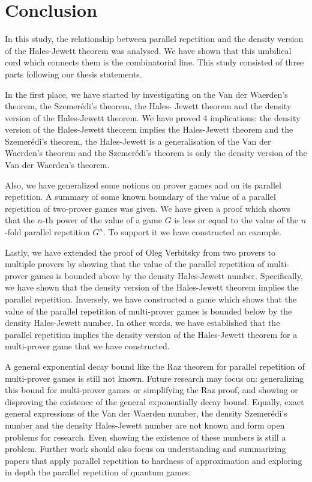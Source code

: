 \chapter{Conclusion}

In this study, the relationship between parallel repetition and the density version of the Hales-Jewett theorem was analysed. We have shown that this umbilical cord which connects them is the combinatorial line. This study consisted of three parts  following our thesis statements. 

In the first place, we have started by investigating on
the Van der Waerden's theorem,  the Szemerédi's theorem, the Hales-  Jewett theorem
and the density version of the Hales-Jewett theorem. We have proved 4 implications: the density version of the Hales-Jewett theorem implies the Hales-Jewett theorem and the Szemerédi's theorem, the Hales-Jewett is a generalisation of the Van der Waerden's theorem and the Szemerédi's theorem is only the density version of the Van der Waerden's theorem.

Also, we have generalized
some notions on prover games and on its parallel repetition. A summary of some known boundary of the value of a parallel repetition of two-prover games was given. We have given a proof which shows that the $n$-th power of the value of a game $G$  is less or equal to the value of the $n$-fold parallel repetition $G^n.$
To support it we have constructed  an example.

Lastly, we have extended the proof of Oleg Verbitsky from two provers to multiple provers by showing that the value of the parallel repetition of multi-prover games is bounded above by the density Hales-Jewett number. Specifically, we have shown that the density version of the Hales-Jewett theorem implies the parallel repetition. Inversely, we have constructed a game which shows that the value of the parallel repetition of multi-prover games is bounded below by the density Hales-Jewett number. In other words, we have established that the parallel repetition implies the density version of the Hales-Jewett theorem for a multi-prover game that we have constructed.

A general exponential decay bound like the Raz theorem for parallel repetition of  multi-prover games is still not known. Future research may focus on: generalizing this bound for multi-prover games or simplifying the Raz proof, and showing or disproving the existence of the general exponentially decay
bound. Equally,  exact general expressions of the Van der Waerden number, the density Szemerédi's number and the density Hales-Jewett number are not known and form open problems for research. Even showing the existence of these numbers is still a problem.
Further work should also focus on understanding and summarizing papers that apply parallel repetition to hardness of approximation and exploring in depth the parallel repetition of quantum games.